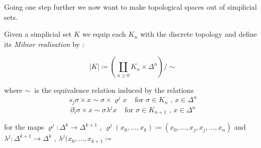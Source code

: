  Going one step further we now want to make topological spaces out of simplicial sets.
 
 \begin{Definition}
  Given a simplicial set $K$ we equip each $K_n$ with the discrete topology and define its \emph{Milnor realisation} by :
  
  $$|K| \coloneqq (\coprod_{n \geq 0} K_n \times \Delta^n) / \sim$$
  
  where $\sim ~$ is the equivalence relation induced by the relations
  $$ s_j \sigma \times x \sim \sigma \times \varrho^j x \; \; \; \; \text{for $\sigma \in K_n$ , $x \in \Delta^n$}$$
  $$ \partial_i \sigma \times x \sim \sigma \lambda^j x \; \; \; \; \text{for $\sigma \in K_{n+1}$ , $x \in \Delta^n$}$$
  
  for the maps $\varrho^j \colon \Delta^k \to \Delta^{k+1}$ ,
  ${\varrho^j(x_0, \dotsc , x_k) \coloneqq (x_0 , \dotsc, x_j , x_j , \dotsc, x_n)}$ and \newline
  ${\lambda^j \colon \Delta^{k+1} \to \Delta^k}$ , 
  ${\lambda^j(x_0, \dotsc, x_{k+1} \coloneqq }$ %
 
 \end{Definition}